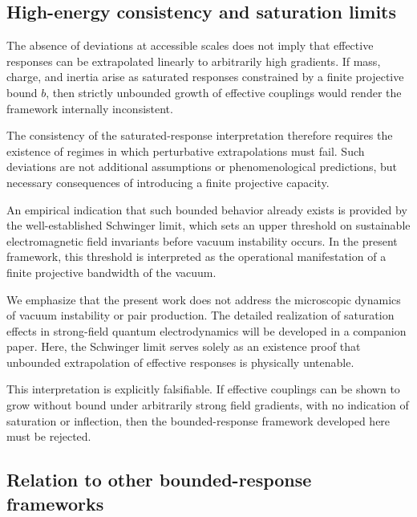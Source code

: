 \documentclass[pdflatex,sn-mathphys-num]{sn-jnl} %
\theoremstyle{remark}
\begin{document}
    \subsection{High-energy consistency and saturation limits}
      \label{subsec:high-energy-consistency}

      The absence of deviations at accessible scales does not imply that effective
      responses can be extrapolated linearly to arbitrarily high gradients.
      If mass, charge, and inertia arise as saturated responses constrained by a
      finite projective bound $b$, then strictly unbounded growth of effective
      couplings would render the framework internally inconsistent.

      The consistency of the saturated-response interpretation therefore requires
      the existence of regimes in which perturbative extrapolations must fail.
      Such deviations are not additional assumptions or phenomenological
      predictions, but necessary consequences of introducing a finite projective
      capacity.

      An empirical indication that such bounded behavior already exists is provided
      by the well-established Schwinger limit, which sets an upper threshold on
      sustainable electromagnetic field invariants before vacuum instability
      occurs.
      In the present framework, this threshold is interpreted as the operational
      manifestation of a finite projective bandwidth of the vacuum.

      We emphasize that the present work does not address the microscopic dynamics
      of vacuum instability or pair production.
      The detailed realization of saturation effects in strong-field quantum
      electrodynamics will be developed in a companion paper.
      Here, the Schwinger limit serves solely as an existence proof that unbounded
      extrapolation of effective responses is physically untenable.

      This interpretation is explicitly falsifiable.
      If effective couplings can be shown to grow without bound under arbitrarily
      strong field gradients, with no indication of saturation or inflection, then
      the bounded-response framework developed here must be rejected.

    \subsection{Relation to other bounded-response frameworks}
      \label{subsec:bounded}
\end{document}

